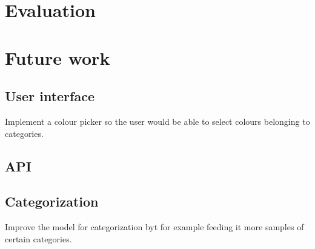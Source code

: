\section{Evaluation}

\section{Future work}
\subsection{User interface}
Implement a colour picker so the user would be able to select colours belonging to categories. 
\subsection{API}
\subsection{Categorization}
Improve the model for categorization byt for example feeding it more samples of certain categories. 
